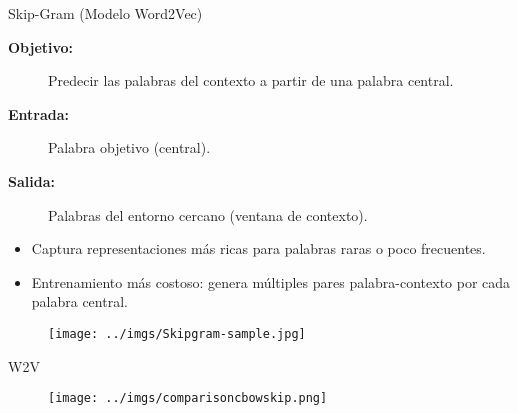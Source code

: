 \documentclass{beamer}
\begin{document}
\begin{frame}{Skip-Gram (Modelo Word2Vec)}
  \begin{description}
    \item[\textbf{Objetivo:}] Predecir las palabras del contexto a partir de una palabra central.
    \item[\textbf{Entrada:}] Palabra objetivo (central).
    \item[\textbf{Salida:}] Palabras del entorno cercano (ventana de contexto).
  \end{description}

  \vspace{0.3cm}
{\small  
  \begin{itemize}
    \item Captura representaciones más ricas para palabras raras o poco frecuentes.
    \item Entrenamiento más costoso: genera múltiples pares palabra-contexto por cada palabra central.
  \end{itemize}
}
  \begin{figure}
    \centering
    \texttt{[image: ../imgs/Skipgram-sample.jpg]} %
  
  \end{figure}
\end{frame}





\begin{frame}{W2V}
\begin{figure}
    \centering
    \texttt{[image: ../imgs/comparisoncbowskip.png]} %
\end{figure}
\end{frame}
\end{document}

